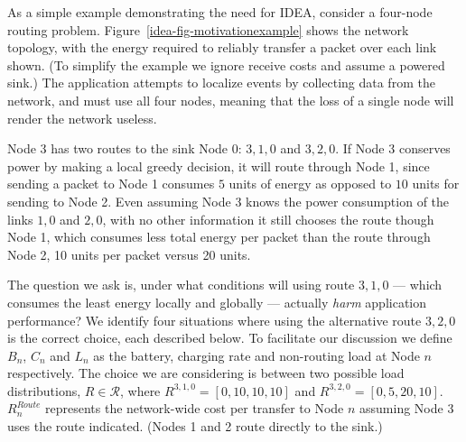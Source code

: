 As a simple example demonstrating the need for IDEA, consider a four-node
routing problem. Figure~\ref{idea-fig-motivationexample} shows the network
topology, with the energy required to reliably transfer a packet over each
link shown. (To simplify the example we ignore receive costs and assume a
powered sink.) The application attempts to localize events by collecting data
from the network, and must use all four nodes, meaning that the loss of a
single node will render the network useless.

Node 3 has two routes to the sink Node 0: $3,1,0$ and $3,2,0$. If Node 3
conserves power by making a local greedy decision, it will route through Node
1, since sending a packet to Node 1 consumes $5$ units of energy as opposed
to $10$ units for sending to Node 2. Even assuming Node 3 knows the power
consumption of the links $1,0$ and $2,0$, with no other information it still
chooses the route though Node 1, which consumes less total energy per packet
than the route through Node 2, 10 units per packet versus 20 units.

The question we ask is, under what conditions will using route $3,1,0$ ---
which consumes the least energy locally and globally --- actually
\textit{harm} application performance? We identify four situations where
using the alternative route $3,2,0$ is the correct choice, each described
below. To facilitate our discussion we define $B_n$, $C_n$ and $L_n$ as the
battery, charging rate and non-routing load at Node $n$ respectively. The
choice we are considering is between two possible load distributions, $R \in
\mathcal{R}$, where $R^{3,1,0} = [0, 10, 10, 10]$ and $R^{3,2,0} = [0, 5, 20,
10]$. $R^{Route}_n$ represents the network-wide cost per transfer to Node $n$
assuming Node 3 uses the route indicated. (Nodes 1 and 2 route directly to
the sink.)

